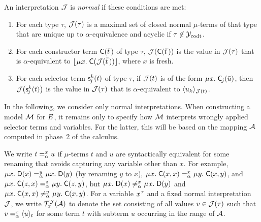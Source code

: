 
\begin{definition}
\afterDot%
\label{def:norm-interpretation}%
\rm
An interpretation $\J$ is \emph{normal} if these conditions are met:
\begin{enumerate}
\item
For each type $\tau$,
$\J( \tau )$ is a maximal set of closed normal $\mu$-terms of that type that are
unique up to $\alpha$-equivalence and acyclic if $\tau \not\in \Codata$.
\item
For each constructor term $\const{C}( \vec t \,)$ of type $\tau$,
$\J( \const{C}( \vec t \,) )$ is the value
in $\J( \tau )$ that is $\alpha$-equivalent to
$\nf{\MU x.\; \const{C}( \J( \vec t \,) )}$, where $x$ is fresh.
\item
For each selector term $\const s^k_{\negvthinspace j}( t )$ of type $\tau$, %
if $\J( t )$ is of the form $\MU x.\; \const{C}_{\negvthinspace j}( \vec u )$, 
then $\J\negvvthinspace\bigl( \const s^k_{\negvthinspace j}( t ) \bigr)$ is the value
in $\J( \tau )$ that is $\alpha$-equivalent to
$\interp{\J( t )}{u_k}$.
\end{enumerate}
\end{definition}

In the following, we consider only normal interpretations.
When constructing a model $\M$ for $\Ec$,
it remains only to specify how $\M$ interprets wrongly applied selector terms and variables.%
For the latter, this will be based on the mapping $\Val$ computed in phase~2 of the calculus.

We write $t \vsimv{x} u$ if $\mu$-terms $t$ and $u$ are syntactically equivalent
for some renaming that avoids capturing any variable other than $x$.
For example,
$\MU x.\; \const{D}( x ) \vsimv{y} \MU x.\; \const{D}( y )$
(by renaming $y$ to $x$),
$\MU x.\; \const{C}( x, x ) \vsimv{x} \MU y.\; \const{C}( x, y )$, and
$\MU x.\; \const{C}( z, x ) \vsimv{z} \MU y.\; \const{C}( z, y )$,
but
$\MU x.\; \const{D}( x ) \not\vsimv{x} \MU x.\; \const{D}( y )$ and
$\MU x.\; \const{C}( x, x ) \not\vsimv{y} \MU y.\; \const{C}( x, y )$.
For a variable $x\typ{\tau}$ and a fixed normal interpretation $\J$,
we write $\mathcal{T}^{\smash{\J}}_x( \Val )$ to denote the set consisting of all values
$v \in \J( \tau )$
such that $v \vsimv{x} \interp{t}{u}$ for some term $t$ with subterm $u$ occurring in the range of $\Val$.

